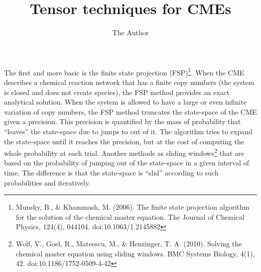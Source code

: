 \documentclass[11pt]{amsart}
\title{Tensor techniques for CMEs}
\author{The Author}
\begin{document}
\maketitle

The first and more basic is the finite state projection (FSP)\footnote{Munsky, B., \& Khammash, M. (2006). The finite state projection algorithm for the solution of the chemical master equation. The Journal of Chemical Physics, 124(4), 044104. doi:10.1063/1.2145882}. When the CME describes a chemical reaction network that has a finite copy numbers (the system is closed and does not create species), the FSP method provides an exact analytical solution. When the system is allowed to have a large or even infinite variation of copy numbers, the FSP method truncates the state-space of the CME given a precision. This precision is quantified by the mass of probability that ``leaves'' the state-space due to jumps to out of it. The algorithm tries to expand the state-space until it reaches the precision, but at the cost of computing the whole probability at each trial. Another methods as sliding windows\footnote{Wolf, V., Goel, R., Mateescu, M., \& Henzinger, T. A. (2010). Solving the chemical master equation using sliding windows. BMC Systems Biology, 4(1), 42. doi:10.1186/1752-0509-4-42 } that are based on the probability of jumping out of the state-space in a given interval of time. The difference is that the state-space is ``slid'' according to such probabilities and iteratively.
\end{document}
